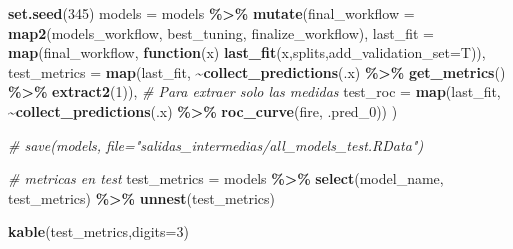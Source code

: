 \documentclass[12pt,a4paper,]{book}
\newenvironment{Shaded}{\begin{snugshade}}{\end{snugshade}}
\newcommand{\AttributeTok}[1]{\textcolor[rgb]{0.13,0.29,0.53}{#1}}
\newcommand{\CommentTok}[1]{\textcolor[rgb]{0.56,0.35,0.01}{\textit{#1}}}
\newcommand{\ControlFlowTok}[1]{\textcolor[rgb]{0.13,0.29,0.53}{\textbf{#1}}}
\newcommand{\DecValTok}[1]{\textcolor[rgb]{0.00,0.00,0.81}{#1}}
\newcommand{\FunctionTok}[1]{\textcolor[rgb]{0.13,0.29,0.53}{\textbf{#1}}}
\newcommand{\NormalTok}[1]{#1}
\newcommand{\OtherTok}[1]{\textcolor[rgb]{0.56,0.35,0.01}{#1}}
\newcommand{\SpecialCharTok}[1]{\textcolor[rgb]{0.81,0.36,0.00}{\textbf{#1}}}
\numberwithin{dummy}{section}
\theoremstyle{ocrenumbox}
\theoremstyle{blacknumex}
\theoremstyle{blacknumbox}
\theoremstyle{ocrenum}
\theoremstyle{ocrenum}
\begin{document}
\begin{Shaded}
\begin{Highlighting}[]
\FunctionTok{set.seed}\NormalTok{(}\DecValTok{345}\NormalTok{)}
\NormalTok{models }\OtherTok{=}\NormalTok{ models }\SpecialCharTok{\%\textgreater{}\%} 
  \FunctionTok{mutate}\NormalTok{(}\AttributeTok{final\_workflow =} \FunctionTok{map2}\NormalTok{(models\_workflow, }
\NormalTok{                               best\_tuning, }
\NormalTok{                               finalize\_workflow),}
         \AttributeTok{last\_fit =} \FunctionTok{map}\NormalTok{(final\_workflow, }
                        \ControlFlowTok{function}\NormalTok{(x) }\FunctionTok{last\_fit}\NormalTok{(x,splits,}\AttributeTok{add\_validation\_set=}\NormalTok{T)),}
         \AttributeTok{test\_metrics =} \FunctionTok{map}\NormalTok{(last\_fit,      }
                            \SpecialCharTok{\textasciitilde{}}\FunctionTok{collect\_predictions}\NormalTok{(.x) }\SpecialCharTok{\%\textgreater{}\%}  
                              \FunctionTok{get\_metrics}\NormalTok{() }\SpecialCharTok{\%\textgreater{}\%}  
                              \FunctionTok{extract2}\NormalTok{(}\DecValTok{1}\NormalTok{)), }\CommentTok{\# Para extraer solo las medidas}
         \AttributeTok{test\_roc =} \FunctionTok{map}\NormalTok{(last\_fit,}
                        \SpecialCharTok{\textasciitilde{}}\FunctionTok{collect\_predictions}\NormalTok{(.x) }\SpecialCharTok{\%\textgreater{}\%}     
                          \FunctionTok{roc\_curve}\NormalTok{(fire, .pred\_0)) }
\NormalTok{         )}

\CommentTok{\# save(models, file="salidas\_intermedias/all\_models\_test.RData")}

\CommentTok{\# metricas en test}
\NormalTok{test\_metrics }\OtherTok{=}\NormalTok{ models }\SpecialCharTok{\%\textgreater{}\%} 
  \FunctionTok{select}\NormalTok{(model\_name, test\_metrics) }\SpecialCharTok{\%\textgreater{}\%} 
  \FunctionTok{unnest}\NormalTok{(test\_metrics)}

\FunctionTok{kable}\NormalTok{(test\_metrics,}\AttributeTok{digits=}\DecValTok{3}\NormalTok{)}


\end{Highlighting}
\end{Shaded}
\end{document}
